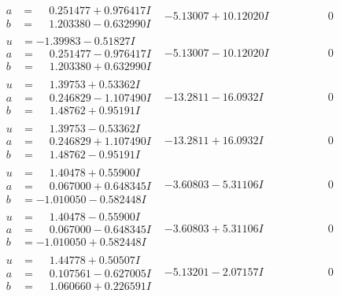 \documentclass[1p]{elsarticle_modified}
\theoremstyle{definition}
\begin{document}
$$\begin{array}{c|c|c}
\begin{aligned}
a &= \phantom{-}0.251477 + 0.976417 I \\
b &= \phantom{-}1.203380 - 0.632990 I\end{aligned}
 & -5.13007 + 10.12020 I & \phantom{-0.000000 } 0 \\ \hline\begin{aligned}
u &= -1.39983 - 0.51827 I \\
a &= \phantom{-}0.251477 - 0.976417 I \\
b &= \phantom{-}1.203380 + 0.632990 I\end{aligned}
 & -5.13007 - 10.12020 I & \phantom{-0.000000 } 0 \\ \hline\begin{aligned}
u &= \phantom{-}1.39753 + 0.53362 I \\
a &= \phantom{-}0.246829 - 1.107490 I \\
b &= \phantom{-}1.48762 + 0.95191 I\end{aligned}
 & -13.2811 - 16.0932 I & \phantom{-0.000000 } 0 \\ \hline\begin{aligned}
u &= \phantom{-}1.39753 - 0.53362 I \\
a &= \phantom{-}0.246829 + 1.107490 I \\
b &= \phantom{-}1.48762 - 0.95191 I\end{aligned}
 & -13.2811 + 16.0932 I & \phantom{-0.000000 } 0 \\ \hline\begin{aligned}
u &= \phantom{-}1.40478 + 0.55900 I \\
a &= \phantom{-}0.067000 + 0.648345 I \\
b &= -1.010050 - 0.582448 I\end{aligned}
 & -3.60803 - 5.31106 I & \phantom{-0.000000 } 0 \\ \hline\begin{aligned}
u &= \phantom{-}1.40478 - 0.55900 I \\
a &= \phantom{-}0.067000 - 0.648345 I \\
b &= -1.010050 + 0.582448 I\end{aligned}
 & -3.60803 + 5.31106 I & \phantom{-0.000000 } 0 \\ \hline\begin{aligned}
u &= \phantom{-}1.44778 + 0.50507 I \\
a &= \phantom{-}0.107561 - 0.627005 I \\
b &= \phantom{-}1.060660 + 0.226591 I\end{aligned}
 & -5.13201 - 2.07157 I & \phantom{-0.000000 } 0 \\ \hline\begin{aligned}

\end{aligned}
\end{array}$$
\end{document}
